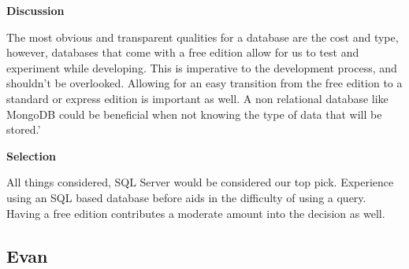 \documentclass[letterpaper, 10pt, draftclsnofoot, compsoc, onecolumn]{IEEEtran}
\begin{document}
{\newpage
{\noindent\rmfamily\bfseries\color{black} Discussion \par}
{\noindent The most obvious and transparent qualities for a database are the cost and type, however, databases that come with a free edition allow for us to test and experiment while developing. This is imperative to the development process, and shouldn't be overlooked. Allowing for an easy transition from the free edition to a standard or express edition is important as well. A non relational database like MongoDB could be beneficial when not knowing the type of data that will be stored.' \par}

\medskip
{\noindent\rmfamily\bfseries\color{black} Selection \par}
{\noindent All things considered, SQL Server would be considered our top pick. Experience using an SQL based database before aids in the difficulty of using a query. Having a free edition contributes a moderate amount into the decision as well.\par}

\medskip








\newpage
\subsection{Evan}
\vspace{1pc}
}
\end{document}
